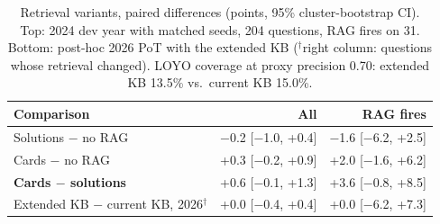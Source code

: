 \begin{table}[!t]
\centering
\scriptsize
\caption{Retrieval variants, paired differences (points, 95\% cluster-bootstrap CI). Top: 2024 dev year with matched seeds, 204 questions, RAG fires on 31. Bottom: post-hoc 2026 PoT with the extended KB ($^\dagger$right column: questions whose retrieval changed). LOYO coverage at proxy precision 0.70: extended KB 13.5\% vs.\ current KB 15.0\%.}
\label{tab:v4rag}
\setlength{\tabcolsep}{2.5pt}
\begin{tabular}{lrr}
\toprule
Comparison & All & RAG fires \\
\midrule
Solutions $-$ no RAG & $-$0.2 [$-$1.0, +0.4] & $-$1.6 [$-$6.2, +2.5] \\
Cards $-$ no RAG & +0.3 [$-$0.2, +0.9] & +2.0 [$-$1.6, +6.2] \\
\textbf{Cards $-$ solutions} & +0.6 [$-$0.1, +1.3] & +3.6 [$-$0.8, +8.5] \\
\midrule
Extended KB $-$ current KB, 2026$^\dagger$ & +0.0 [$-$0.4, +0.4] & +0.0 [$-$6.2, +7.3] \\
\bottomrule
\end{tabular}
\end{table}
